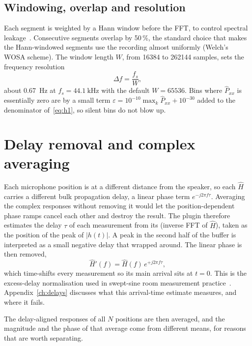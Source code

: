 \subsection{Windowing, overlap and resolution}
Each segment is weighted by a Hann window before the FFT, to control spectral leakage~\cite{Harris1978}. Consecutive segments overlap by 50\,\%, the standard choice that makes the Hann-windowed segments use the recording almost uniformly (Welch's WOSA scheme). The window length $W$, from 16384 to 262144 samples, sets the frequency resolution
\begin{equation}
  \Delta f = \frac{f_s}{W},
\end{equation}
about \SI{0.67}{\hertz} at $f_s=\SI{44.1}{\kHz}$ with the default $W=65536$. Bins where $\hat P_{xx}$ is essentially zero are  by a small term $\varepsilon = 10^{-10}\max_k \hat P_{xx} + 10^{-30}$ added to the denominator of~\eqref{eq:h1}, so silent bins do not blow up.

\section{Delay removal and complex averaging}\label{sec:thavg}
Each microphone position is at a different distance from the speaker, so each $\hat H$ carries a different bulk propagation delay, a linear phase term $e^{-j2\pi f \tau}$. Averaging the complex responses without removing it would let the position-dependent phase ramps cancel each other and destroy the result. The plugin therefore estimates the delay $\tau$ of each measurement from its  (inverse FFT of $\hat H$), taken as the position of the peak of $|h(t)|$. A peak in the second half of the buffer is interpreted as a small negative delay that wrapped around. The linear phase is then removed,
\begin{equation}
  \hat H'(f) = \hat H(f)\, e^{+j 2\pi f \tau},
\end{equation}
which time-shifts every measurement so its main arrival sits at $t=0$. This is the excess-delay normalisation used in swept-sine room measurement practice~\cite{MullerMassarani}. Appendix~\ref{ch:delays} discusses what this arrival-time estimate measures, and where it fails.

The delay-aligned responses of all $N$ positions are then averaged, and the magnitude and the phase of that average come from different means, for reasons that are worth separating.


